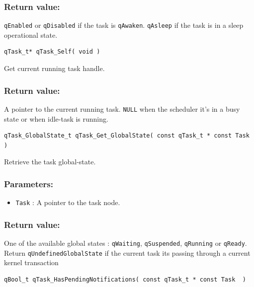\documentclass{article}
\begin{document}
\subsubsection*{Return value:}
\lstinline{qEnabled} or \lstinline{qDisabled} if the task is \lstinline{qAwaken}. \lstinline{qAsleep} if the task is in a sleep operational state.

\noindent\hrulefill


\begin{lstlisting}[style=CStyle]
qTask_t* qTask_Self( void )
\end{lstlisting}

Get current running task handle. 

\subsubsection*{Return value:}
A pointer to the current running task. \lstinline{NULL} when the scheduler it's in a busy state or when idle-task is running.


\noindent\hrulefill


\begin{lstlisting}[style=CStyle]
qTask_GlobalState_t qTask_Get_GlobalState( const qTask_t * const Task )
\end{lstlisting}

Retrieve the task global-state. 

\subsubsection*{Parameters:}
\begin{itemize}
    \item \lstinline{Task} : A pointer to the task node.
\end{itemize}


\subsubsection*{Return value:}
One of the available global states : \lstinline{qWaiting}, \lstinline{qSuspended}, \lstinline{qRunning} or \lstinline{qReady}.
Return \lstinline{qUndefinedGlobalState} if the current task its passing through a current kernel transaction

\noindent\hrulefill

\begin{lstlisting}[style=CStyle]
qBool_t qTask_HasPendingNotifications( const qTask_t * const Task  )
\end{lstlisting}
\end{document}
